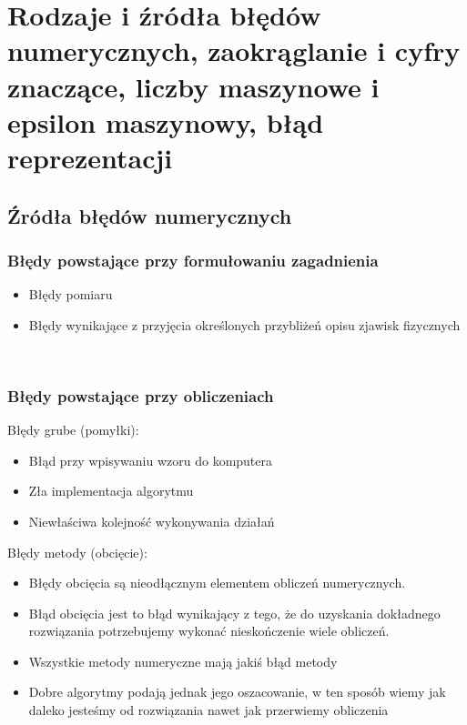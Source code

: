 \documentclass[a4paper]{article}
\begin{document}
\section{Rodzaje i źródła błędów numerycznych, zaokrąglanie i cyfry znaczące, liczby maszynowe i epsilon maszynowy, błąd reprezentacji}

\subsection{Źródła błędów numerycznych}
\subsubsection{Błędy powstające przy formułowaniu zagadnienia}
\begin{itemize}
    \item Błędy pomiaru
    \item Błędy wynikające z przyjęcia określonych przybliżeń opisu zjawisk fizycznych
\end{itemize}\

\subsubsection{Błędy powstające przy obliczeniach}

Błędy grube (pomyłki):
\begin{itemize}
    \item Błąd przy wpisywaniu wzoru do komputera
    \item Zła implementacja algorytmu
    \item Niewłaściwa kolejność wykonywania działań
\end{itemize}

Błędy metody (obcięcie):
\begin{itemize}
    \item Błędy obcięcia są nieodłącznym elementem obliczeń numerycznych.
    \item Błąd obcięcia jest to błąd wynikający z tego, że do uzyskania dokładnego rozwiązania potrzebujemy wykonać nieskończenie wiele obliczeń.
    \item Wszystkie metody numeryczne mają jakiś błąd metody
    \item Dobre algorytmy podają jednak jego oszacowanie, w ten sposób wiemy jak daleko jesteśmy od rozwiązania nawet jak przerwiemy obliczenia
\end{itemize}
\end{document}
